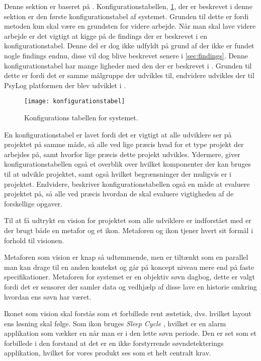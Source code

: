 Denne sektion er baseret på \citet{art:essence}.
Konfigurationstabellen, \cref{tab:konfigurationsTabel}, der er beskrevet i denne sektion er den første konfigurationstabel af systemet.
Grunden til dette er fordi metoden kun skal være en grundsten for videre arbejde.
Når man skal lave videre arbejde er det vigtigt at kigge på de findings der er beskrevet i en konfigurationstabel.
Denne del er dog ikke udfyldt på grund af der ikke er fundet nogle findings endnu, disse vil dog blive beskrevet senere i \cref{sec:findings}.
Denne konfigurationstabel har mange ligheder med den der er beskrevet i \citet{misc:faellesrapp}.
Grunden til dette er fordi det er samme målgruppe der udvikles til, endvidere udvikles der til PsyLog platformen der blev udviklet i \citet{misc:faellesrapp}.

\begin{figure}[]\centering
	\texttt{[image: konfigurationstabel]}
	\caption{Konfigurations tabellen for systemet.}
	\label{tab:konfigurationsTabel}
\end{figure}

En konfigurationstabel er lavet fordi det er vigtigt at alle udviklere ser på projektet på samme måde, så alle ved lige præcis hvad for et type projekt der arbejdes på, samt hvorfor lige præcis dette projekt udvikles.
Ydermere, giver konfigurationstabellen også et overblik over hvilket komponenter der kan bruges til at udvikle projektet, samt også hvilket begrænsninger der muligvis er i projektet.
Endvidere, beskriver konfigurationstabellen også en måde at evaluere projektet på, så alle ved præcis hvordan de skal evaluere vigtigheden af de forskellige opgaver.

Til at få udtrykt en vision for projektet som alle udviklere er indforstået med er der brugt både en metafor og et ikon.
Metaforen og ikon tjener hvert sit formål i forhold til visionen.

Metaforen som vision er knap så udtømmende, men er tiltænkt som en parallel man kan drage til en anden kontekst og går på koncept niveau mere end på faste specifikationer.
Metaforen for systemet er en objektiv søvn dagbog, dette er valgt fordi det er sensorer der samler data og vedhjælp af disse lave en historie omkring hvordan ens søvn har været.

Ikonet som vision skal forstås som et forbillede rent æstetisk, dvs. hvilket layout ens løsning skal følge.
Som ikon bruges \textit{Sleep Cycle} \citep{misc:sleepCycle}, hvilket er en alarm applikation som vækker en når man er i den lette søvn periode.
Den er set som et forbillede i den forstand at det er en ikke forstyrrende søvndetekterings applikation, hvilket for vores produkt ses som et helt centralt krav.